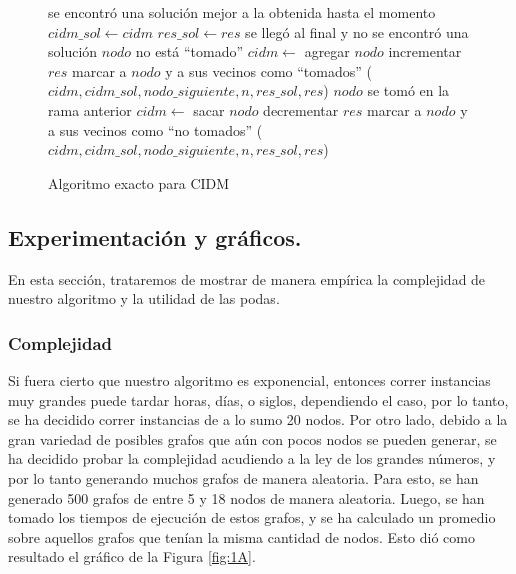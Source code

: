 \begin{figure}
\begin{codebox}
\li \If se encontró una solución mejor a la obtenida hasta el momento
\li \Then 
 		$cidm\_sol \leftarrow cidm$
\li 		$res\_sol \leftarrow res$ 		
\li 		\Return
	\End
\li \If se llegó al final y no se encontró una solución
\li \Then \Return
	\End
\li \If $nodo$ no está ``tomado''	
\li \Then
		$cidm \leftarrow$ agregar $nodo$
\li 		incrementar $res$
\li 		marcar a $nodo$ y a sus vecinos como ``tomados''
($cidm,cidm\_sol,nodo\_siguiente,n,res\_sol,res$)
	\End
\li 	\If $nodo$ se tomó en la rama anterior
\li 	\Then
		$cidm \leftarrow$ sacar $nodo$
\li		decrementar $res$
\li 		marcar a $nodo$ y a sus vecinos como ``no tomados''
	\End
{}($cidm,cidm\_sol,nodo\_siguiente,n,res\_sol,res$)
\end{codebox}
\caption{Algoritmo exacto para CIDM}\label{code:exacto}
\end{figure}

\vspace*{0.6cm}
\subsection{Experimentación y gráficos.}

\vspace*{0.3cm}

En esta sección, trataremos de mostrar de manera empírica la complejidad de nuestro algoritmo y la utilidad de las podas.

\subsubsection{Complejidad}

Si fuera cierto que nuestro algoritmo es exponencial, entonces correr instancias muy grandes puede tardar horas, días, o siglos, dependiendo el caso, por lo tanto, se ha decidido correr instancias de a lo sumo 20 nodos. Por otro lado, debido a la gran variedad de posibles grafos que aún con pocos nodos se pueden generar, se ha decidido probar la complejidad acudiendo a la ley de los grandes números, y por lo tanto generando muchos grafos de manera aleatoria. Para esto, se han generado 500 grafos de entre 5 y 18 nodos de manera aleatoria. Luego, se han tomado los tiempos de ejecución de estos grafos, y se ha calculado un promedio sobre aquellos grafos que tenían la misma cantidad de nodos. Esto dió como resultado el gráfico de la Figura \ref{fig:1A}.
%

